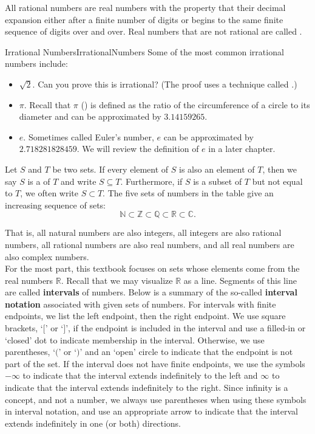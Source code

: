 All rational numbers are real numbers with the property that
their decimal expansion either  after a finite number 
of digits or begins to  the same finite sequence of digits over and over.
Real numbers that are not rational are called . \\



\begin{example}{Irrational Numbers}{IrrationalNumbers}
Some of the most common irrational numbers include:
\begin{itemize}
	\item $\sqrt 2$.\quad 
			Can you prove this is irrational? (The proof uses a technique called .)
	\item $\pi$.\quad 
			Recall that $\pi$ () is defined as the ratio of the circumference of a circle to its diameter and can be approximated by $3.14159265$.
	\item $e$.\quad 
			Sometimes called Euler's number, $e$ can be approximated by $2.718281828459$. 
			We will review the definition of $e$ in a later chapter.
\end{itemize}
\end{example}

Let $S$ and $T$ be two sets. If every element of $S$ is also an element of $T$, then
we say $S$ is a  of $T$ and write $S\subseteq T$. Furthermore, if $S$ is
a subset of $T$ but not equal to $T$, we often write $S\subset T$.
The five sets of numbers in the table give an increasing sequence of sets:
\[ \mathbb{N} \subset \mathbb{Z} \subset \mathbb{Q} \subset \mathbb{R} \subset \mathbb{C}. \]

That is, all natural numbers are also integers, all integers are also rational numbers, all rational numbers are also real numbers, and all real numbers are also complex numbers.\\

For the most part, this textbook focuses on sets whose elements come from the real numbers $\mathbb R$.  Recall that we may visualize $\mathbb R$ as a line. Segments of this line are called \textbf{intervals} of numbers. Below is a summary of the so-called \textbf{interval notation} associated with given sets of numbers.  For intervals with finite endpoints, we list the left endpoint, then the right endpoint.  We use square brackets, `$[$' or `$]$', if the endpoint is included in the interval and use a filled-in or `closed' dot to indicate membership in the interval. Otherwise, we use parentheses, `$($' or `$)$' and an `open' circle to indicate that the endpoint is not part of the set.  If the interval does not have finite endpoints, we use the symbols $-\infty$ to indicate that the interval extends indefinitely to the left and $\infty$ to indicate that the interval extends indefinitely to the right.  Since infinity is a concept, and not a number, we always use parentheses when using these symbols in interval notation, and use an appropriate arrow to indicate that the interval extends indefinitely in one (or both) directions.\\



